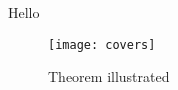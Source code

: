 \documentclass{amsart}
\begin{document}
Hello

\begin{figure}[h]
    \texttt{[image: covers]}
    \caption{Theorem illustrated}
\end{figure}
\end{document}
